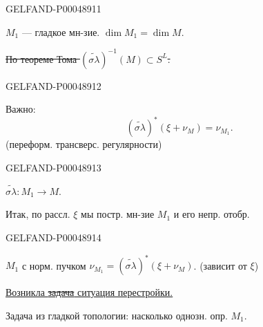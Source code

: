 \begin{GelfandAdjacentEvidence}{GELFAND-P000489}{11}

$M_1$ — гладкое мн-зие. $\dim M_1=\dim M$.

\sout{По теореме Тома \mbox{$(\widetilde{\sigma\lambda})^{-1}(M)\subset S^L$}.}
\end{GelfandAdjacentEvidence}
\begin{GelfandAdjacentEvidence}{GELFAND-P000489}{12}


Важно:
\[
\boxed{(\widetilde{\sigma\lambda})^*(\xi+\nu_M)=\nu_{M_1}.}
\]
(переформ. трансверс. регулярности)
\end{GelfandAdjacentEvidence}
\begin{GelfandAdjacentEvidence}{GELFAND-P000489}{13}


$\widetilde{\sigma\lambda}:M_1\longrightarrow M$.

Итак, по рассл. $\xi$ мы постр. мн-зие $M_1$ и его непр. отобр.
\end{GelfandAdjacentEvidence}
\begin{GelfandAdjacentEvidence}{GELFAND-P000489}{14}


$M_1$ с норм. пучком
$\nu_{M_1}=(\widetilde{\sigma\lambda})^*(\xi+\nu_M)$.
(зависит от $\xi$)

\uline{Возникла \mbox{\sout{задача}} ситуация перестройки.}
\end{GelfandAdjacentEvidence}


Задача из гладкой топологии:
насколько однозн. опр. $M_1$.


